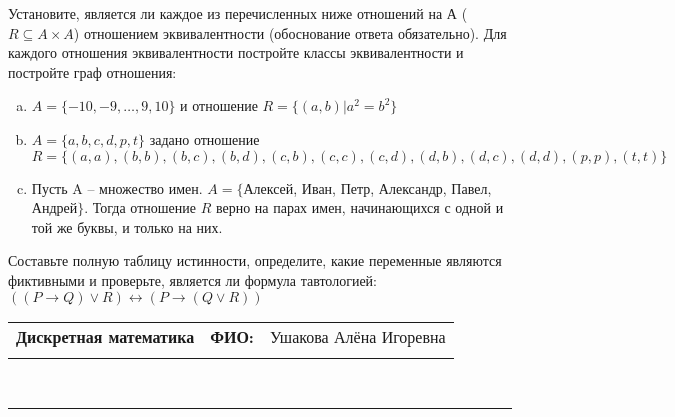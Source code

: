 \documentclass[10pt]{exam}
\newcommand{\class}{Дискретная математика}
\newcommand{\examdate}{}
\begin{document}
\begin{questions}
\question
Установите, является ли каждое из перечисленных ниже отношений на А ($R \subseteq A \times A$) отношением эквивалентности (обоснование ответа обязательно). Для каждого отношения эквивалентности постройте классы 
эквивалентности и постройте граф отношения:
\begin{enumerate} [a)]\setcounter{enumi}{0}
\item $A = \{-10, -9, … , 9, 10\}$ и отношение $R = \{(a,b)|a^{2} = b^{2}\}$
\item $A = \{a, b, c, d, p, t\}$ задано отношение $R = \{(a, a), (b, b), (b, c), (b, d), (c, b), (c, c), (c, d), (d, b), (d, c), (d, d), (p,p), (t,t)\}$
\item Пусть A – множество имен. $A = \{ $Алексей, Иван, Петр, Александр, Павел, Андрей$ \}$. Тогда отношение $R$ верно на парах имен, начинающихся с одной и той же буквы, и только на них.
\end{enumerate}\question Составьте полную таблицу истинности, определите, какие переменные являются фиктивными и проверьте, является ли формула тавтологией:
$((P \rightarrow Q) \lor R) \leftrightarrow (P \rightarrow (Q \lor R))$

\end{questions}
\newpage
\begin{flushright}
\begin{tabular}{p{2.8in} r l}
\textbf{\class} & \textbf{ФИО:} &Ушакова Алёна Игоревна
\\

\textbf{\examdate} &&\\
\end{tabular}\\
\end{flushright}
\rule[1ex]{\textwidth}{.1pt}
\end{document}
